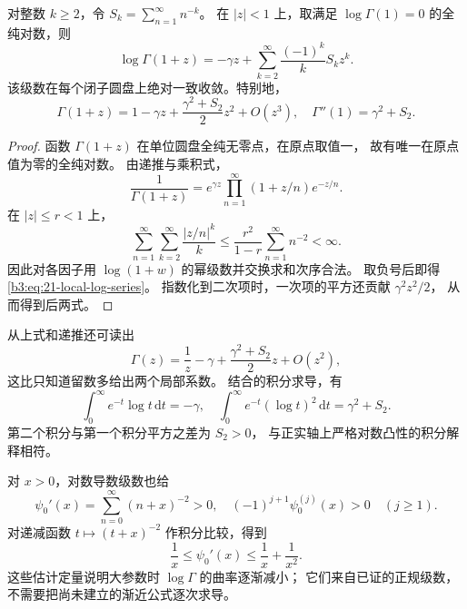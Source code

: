 \begin{proposition}[原点附近的对数展开]\label{b3:prop:21-local-log-series}
对整数 \(k\ge2\)，令 \(S_k=\sum_{n=1}^\infty n^{-k}\)。
在 \(|z|<1\) 上，取满足 \(\log\Gamma(1)=0\) 的全纯对数，则
\begin{equation}\label{b3:eq:21-local-log-series}
 \log\Gamma(1+z)
 =-\gamma z+\sum_{k=2}^\infty\frac{(-1)^k}{k}S_kz^k.
\end{equation}
该级数在每个闭子圆盘上绝对一致收敛。特别地，
\[
 \Gamma(1+z)=1-\gamma z+
       \frac{\gamma^2+S_2}{2}z^2+O(z^3),\quad
 \Gamma''(1)=\gamma^2+S_2.
\]
\end{proposition}
\begin{proof}
函数 \(\Gamma(1+z)\) 在单位圆盘全纯无零点，在原点取值一，
故有唯一在原点值为零的全纯对数。
由递推与乘积式，
\[
 \frac1{\Gamma(1+z)}
 =e^{\gamma z}\prod_{n=1}^\infty(1+z/n)e^{-z/n}.
\]
在 \(|z|\le r<1\) 上，
\[
 \sum_{n=1}^\infty\sum_{k=2}^\infty\frac{|z/n|^k}{k}
 \le\frac{r^2}{1-r}\sum_{n=1}^\infty n^{-2}<\infty.
\]
因此对各因子用 \(\log(1+w)\) 的幂级数并交换求和次序合法。
取负号后即得\eqref{b3:eq:21-local-log-series}。
指数化到二次项时，一次项的平方还贡献 \(\gamma^2z^2/2\)，
从而得到后两式。
\end{proof}

从上式和递推还可读出
\[
 \Gamma(z)=\frac1z-\gamma+\frac{\gamma^2+S_2}{2}z+O(z^2),
\]
这比只知道留数多给出两个局部系数。
结合的积分求导，有
\[
 \int_0^\infty e^{-t}\log t\,\mathrm dt=-\gamma,\quad
 \int_0^\infty e^{-t}(\log t)^2\,\mathrm dt=\gamma^2+S_2.
\]
第二个积分与第一个积分平方之差为 \(S_2>0\)，
与正实轴上严格对数凸性的积分解释相符。

\ProseParagraphBreak
对 \(x>0\)，对数导数级数也给
\[
 \psi_0'(x)=\sum_{n=0}^\infty(n+x)^{-2}>0,\quad
 (-1)^{j+1}\psi_0^{(j)}(x)>0\quad(j\ge1).
\]
对递减函数 \(t\mapsto(t+x)^{-2}\) 作积分比较，得到
\[
 \frac1x\le\psi_0'(x)\le\frac1x+\frac1{x^2}.
\]
这些估计定量说明大参数时 \(\log\Gamma\) 的曲率逐渐减小；
它们来自已证的正规级数，不需要把尚未建立的渐近公式逐次求导。
